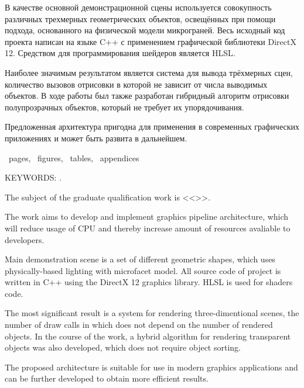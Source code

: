 В качестве основной демонстрационной сцены используется совокупность различных трехмерных геометрических объектов, освещённых при помощи подхода, основанного на физической модели микрограней. Весь исходный код проекта написан на языке C++ с применением графической библиотеки DirectX 12. Средством для программирования шейдеров является HLSL.

Наиболее значимым результатом является система для вывода трёхмерных сцен, количество вызовов отрисовки в которой не зависит от числа выводимых объектов. В ходе работы был также разработан гибридный алгоритм отрисовки полупрозрачных объектов, который не требует их упорядочивания.

Предложенная архитектура пригодна для применения в современных графических приложениях и может быть развита в дальнейшем.


\newpage

\printTheAbstract %


~pages, 
~figures, 
~tables,
~appendices%

{\MakeUppercase{Keywords: \keywordsEn}.} %
	
The subject of the graduate qualification work is <<\thesisTitleEn>>.

The work aims to develop and implement graphics pipeline architecture, which will reduce usage of CPU and thereby increase amount of resources avaliable to developers.

Main demonstration scene is a set of different geometric shapes, which uses physically-based lighting with microfacet model. All source code of project is written in C++ using the DirectX 12 graphics library. HLSL is used for shaders code.

The most significant result is a system for rendering three-dimentional scenes, the number of draw calls in which does not depend on the number of rendered objects. In the course of the work, a hybrid algorithm for rendering transparent objects was also developed, which does not require object sorting.

The proposed architecture is suitable for use in modern graphics applications and can be further developed to obtain more efficient results.
	
	

\newpage
\thispagestyle{empty}
%
